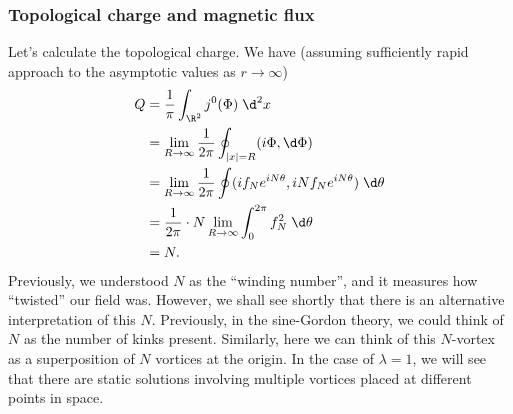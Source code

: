 \documentclass[a4paper]{article}
\begin{document}
\subsubsection*{Topological charge and magnetic flux}
Let's calculate the topological charge. We have (assuming sufficiently rapid approach to the asymptotic values as $r \to \infty$)
\begin{align*}
  Q &= \frac{1}{\pi} \int_{\R^2} j^0(\Phi)\;\d^2 x \\
  &= \lim_{R \to \infty} \frac{1}{2\pi} \oint_{|x| = R} (i \Phi, \d \Phi) \\
  &= \lim_{R \to \infty} \frac{1}{2\pi} \oint (if_N e^{iN\theta}, iN f_N e^{iN\theta})\;\d \theta\\
  &= \frac{1}{2\pi} \cdot N \lim_{R \to \infty} \int_0^{2\pi} f_N^2 \;\d \theta\\
  &= N.
\end{align*}
Previously, we understood $N$ as the ``winding number'', and it measures how ``twisted'' our field was. However, we shall see shortly that there is an alternative interpretation of this $N$. Previously, in the sine-Gordon theory, we could think of $N$ as the number of kinks present. Similarly, here we can think of this $N$-vortex as a superposition of $N$ vortices at the origin. In the case of $\lambda = 1$, we will see that there are static solutions involving multiple vortices placed at different points in space.
\end{document}
